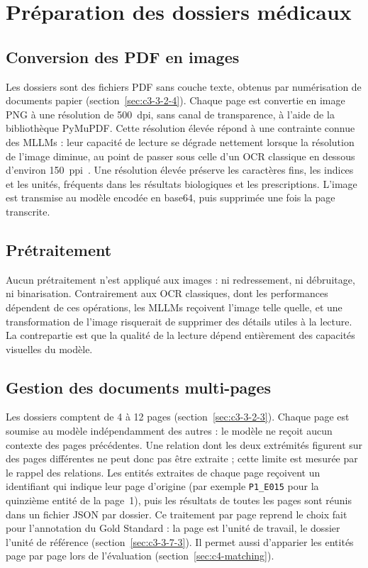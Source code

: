 \section{Préparation des dossiers médicaux}\label{sec:c4-preparation}

\subsection{Conversion des PDF en images}\label{sec:c4-conversion}

Les dossiers sont des fichiers PDF sans couche texte, obtenus par numérisation de documents papier (section~\ref{sec:c3-3-2-4}). Chaque page est convertie en image PNG à une résolution de 500~dpi, sans canal de transparence, à l'aide de la bibliothèque PyMuPDF. Cette résolution élevée répond à une contrainte connue des MLLMs : leur capacité de lecture se dégrade nettement lorsque la résolution de l'image diminue, au point de passer sous celle d'un OCR classique en dessous d'environ 150~ppi~\cite{inoue2025context}. Une résolution élevée préserve les caractères fins, les indices et les unités, fréquents dans les résultats biologiques et les prescriptions. L'image est transmise au modèle encodée en base64, puis supprimée une fois la page transcrite.

\subsection{Prétraitement}\label{sec:c4-pretraitement}

Aucun prétraitement n'est appliqué aux images : ni redressement, ni débruitage, ni binarisation. Contrairement aux OCR classiques, dont les performances dépendent de ces opérations, les MLLMs reçoivent l'image telle quelle, et une transformation de l'image risquerait de supprimer des détails utiles à la lecture. La contrepartie est que la qualité de la lecture dépend entièrement des capacités visuelles du modèle.

\subsection{Gestion des documents multi-pages}\label{sec:c4-multipages}

Les dossiers comptent de 4 à 12 pages (section~\ref{sec:c3-3-2-3}). Chaque page est soumise au modèle indépendamment des autres : le modèle ne reçoit aucun contexte des pages précédentes. Une relation dont les deux extrémités figurent sur des pages différentes ne peut donc pas être extraite ; cette limite est mesurée par le rappel des relations. Les entités extraites de chaque page reçoivent un identifiant qui indique leur page d'origine (par exemple \texttt{P1\_E015} pour la quinzième entité de la page~1), puis les résultats de toutes les pages sont réunis dans un fichier JSON par dossier. Ce traitement par page reprend le choix fait pour l'annotation du Gold Standard : la page est l'unité de travail, le dossier l'unité de référence (section~\ref{sec:c3-3-7-3}). Il permet aussi d'apparier les entités page par page lors de l'évaluation (section~\ref{sec:c4-matching}).

